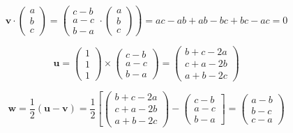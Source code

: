 \begin{equation}
	\mathbf{v} \cdot \left( \begin{array}{c} a\\ b\\ c \end{array} \right) = \left( \begin{array}{c} c - b \\ a - c \\ b - a \end{array} \cdot \left( \begin{array}{c} a\\ b\\ c \end{array} \right) \right) = ac - ab + ab - bc + bc - ac = 0
	\label{eqn:SumAndReciprocalSumEqualZero_FindingOrthogonalVector}
\end{equation}

\begin{equation}
	\mathbf{u} = \left( \begin{array}{c} 1\\ 1\\ 1 \end{array} \right) \times \left( \begin{array}{c} c - b \\ a - c \\ b - a \end{array} \right) = \left( \begin{array}{c} b + c - 2a \\ c + a - 2b \\ a + b - 2c \end{array} \right)
	\label{eqn:SumAndReciprocalSumEqualZero_CrossProduct}
\end{equation}

\begin{equation}
	\mathbf{w} = \frac{1}{2}\left( \mathbf{u} - \mathbf{v} \right) = \frac{1}{2} \left[ \left( \begin{array}{c} b + c - 2a \\ c + a - 2b \\ a + b - 2c \end{array} \right) - \left( \begin{array}{c} c - b \\ a - c \\ b - a \end{array} \right] = \left( \begin{array}{c} a - b \\ b - c \\ c - a \end{array} \right)
\end{equation}

